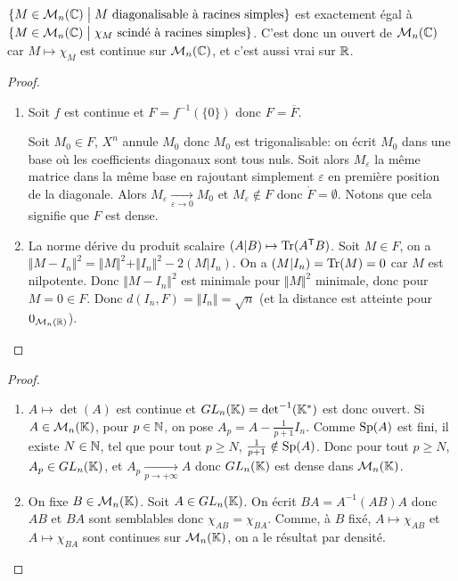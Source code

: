 \begin{remark}
	$\{M\in\mathcal{M}_{n}(\mathbb{C})\bigm|M\text{ diagonalisable à racines simples}\}$ est exactement égal à $\{M\in\mathcal{M}_{n}(\mathbb{C})\bigm|\chi_M\text{ scindé à racines simples}\}$. C'est donc un ouvert de $\mathcal{M}_{n}(\mathbb{C})$ car $M\mapsto\chi_{M}$ est continue sur $\mathcal{M}_{n}(\mathbb{C})$, et c'est aussi vrai sur $\mathbb{R}$.
\end{remark}

\begin{proof}
	\phantom{}
	\begin{enumerate}
		\item Soit 
		$f$ est continue et $F=f^{-1}(\{0\})$ donc $F=\overline{F}$.

		Soit $M_{0}\in F$, $X^{n}$ annule $M_{0}$ donc $M_{0}$ est trigonalisable: on écrit $M_{0}$ dans une base où les coefficients diagonaux sont tous nuls. Soit alors $M_{\varepsilon}$ la même matrice dans la même base en rajoutant simplement $\varepsilon$ en première position de la diagonale. Alors $M_{\varepsilon}\xrightarrow[\varepsilon\to0]{}M_{0}$ et $M_{\varepsilon}\notin F$ donc $\mathring{F}=\emptyset$. Notons que cela signifie que $F$ est dense.

		\item La norme dérive du produit scalaire $(A|B)\mapsto\operatorname{Tr}(A^{\mathsf{T}}B)$. Soit $M\in F$, on a $\Vert M-I_{n}\Vert^{2}=\Vert M\Vert^{2}+\Vert I_{n}\Vert^{2}-2(M|I_{n})$. On a $(M|I_{n})=\operatorname{Tr}(M)=0$ car $M$ est nilpotente. Donc $\Vert M-I_{n}\Vert^{2}$ est minimale pour $\Vert M\Vert^{2}$ minimale, donc pour $M=0\in F$. Donc $d(I_{n},F)=\Vert I_{n}\Vert=\sqrt{n}$ (et la distance est atteinte pour $0_{\mathcal{M}_n(\mathbb{R})}$).
	\end{enumerate}
\end{proof}

\begin{proof}
	\phantom{}
	\begin{enumerate}
		\item $A\mapsto\det(A)$ est continue et $GL_{n}(\mathbb{K})=\det^{-1}(\mathbb{K}^{*})$ est donc ouvert. Si $A\in\mathcal{M}_{n}(\mathbb{K})$, pour $p\in\mathbb{N}$, on pose $A_{p}=A-\frac{1}{p+1}I_{n}$. Comme $\operatorname{Sp}(A)$ est fini, il existe $N\in\mathbb{N}$, tel que pour tout $p\geqslant N$, $\frac{1}{p+1}\notin\operatorname{Sp}(A)$. Donc pour tout $p\geqslant N$, $A_{p}\in GL_{n}(\mathbb{K})$, et $A_{p}\xrightarrow[p\to+\infty]{}A$ donc $GL_{n}(\mathbb{K})$ est dense dans $\mathcal{M}_{n}(\mathbb{K})$.
		\item On fixe $B\in\mathcal{M}_{n}(\mathbb{K})$. Soit $A\in GL_{n}(\mathbb{K})$. On écrit $BA=A^{-1}(AB)A$ donc $AB$ et $BA$ sont semblables donc $\chi_{AB}=\chi_{BA}$. Comme, à $B$ fixé, $A\mapsto\chi_{AB}$ et $A\mapsto\chi_{BA}$ sont continues sur $\mathcal{M}_{n}(\mathbb{K})$, on a le résultat par densité.
	\end{enumerate}
\end{proof}

